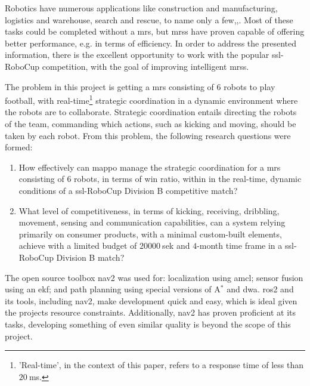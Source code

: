 Robotics have numerous applications like construction and manufacturing, logistics and warehouse, search and rescue, to name only a few\:\cite{singh_artificial_2022},\cite{marquis_robotics_2020},\cite{de_sousa_multi-agent_2024}. Most of these tasks could be completed without a \ac{mrs}, but \acp{mrs} have proven capable of offering better performance, e.g. in terms of efficiency\:\cite{de_sousa_multi-agent_2024}.
In order to address the presented information, there is the excellent opportunity to work with the popular \ac{ssl}-RoboCup competition\:\cite{marquis_robotics_2020}, with the goal of improving intelligent \acp{mrs}.

The problem in this project is getting a \ac{mrs} consisting of 6 robots to play football, with real-time\footnote{'Real-time', in the context of this paper, refers to a response time of less than $20\:$\ac{ms}.} strategic coordination in a dynamic environment where the robots are to collaborate. Strategic coordination entails directing the robots of the team, commanding which actions, such as kicking and moving, should be taken by each robot.
From this problem, the following research questions were formed:
\begin{enumerate}
    \item How effectively can \acf{mappo} manage the strategic coordination for a \acf{mrs} consisting of 6 robots, in terms of win ratio, within in the real-time, dynamic conditions of a \acf{ssl}-RoboCup Division B competitive match?
    \item What level of competitiveness, in terms of kicking, receiving, dribbling, movement, sensing and communication capabilities, can a system relying primarily on consumer products, with a minimal custom-built elements, achieve with a limited budget of $20000\:$\acf{sek} and $4$-month time frame in a \acf{ssl}-RoboCup Division B match?
\end{enumerate}


The open source toolbox nav2 was used for: localization using \ac{amcl}; sensor fusion using an \ac{ekf}; and path planning using special versions of A$^*$ and \ac{dwa}\:\cite{macenski_desks_2023}\cite{macenski_open-source_2024}\cite{macenski_regulated_2023}\cite{merzlyakov_comparison_2021}\cite{macenski_marathon_2020}. 
\ac{ros2} and its tools, including nav2, make development quick and easy, which is ideal given the projects resource constraints\:\cite{macenski_robot_2022}. Additionally, nav2 has proven proficient at its tasks, developing something of even similar quality is beyond the scope of this project\:\cite{macenski_desks_2023}\cite{macenski_open-source_2024}\cite{macenski_regulated_2023}\cite{merzlyakov_comparison_2021}\cite{macenski_marathon_2020}.

